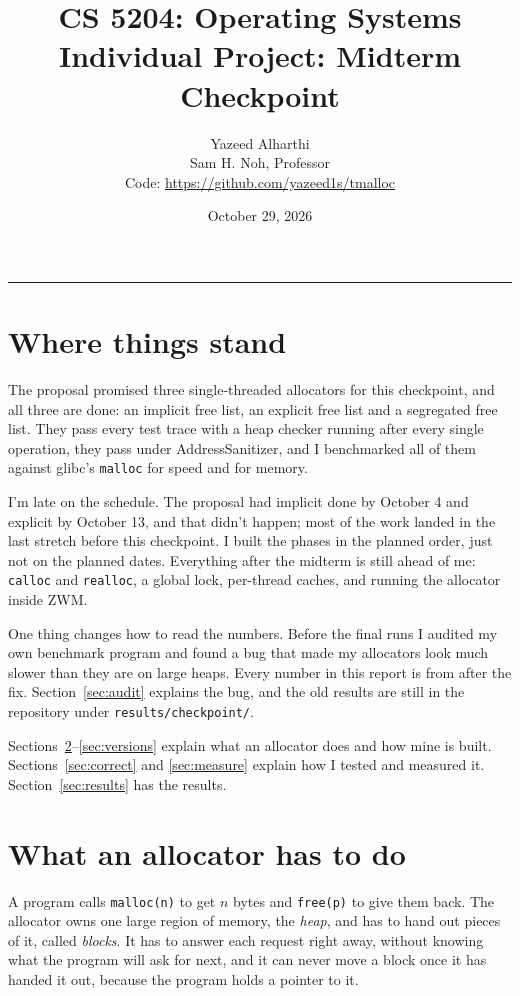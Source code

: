 \documentclass[11pt,letterpaper]{article}
\title{CS 5204: Operating Systems \\ Individual Project: Midterm Checkpoint}
\author{Yazeed Alharthi \\ Sam H. Noh, Professor \\[4pt]
  \small Code: \url{https://github.com/yazeed1s/tmalloc}}
\date{October 29, 2026}
\begin{document}
\maketitle

\begin{center}
  \rule{0.9\textwidth}{0.4pt}
\end{center}

\section{Where things stand}

The proposal promised three single-threaded allocators for this checkpoint, and all three are done: an implicit free list, an explicit free list and a segregated free list. They pass every test trace with a heap checker running after every single operation, they pass under AddressSanitizer, and I benchmarked all of them against glibc's \texttt{malloc} for speed and for memory.

I'm late on the schedule. The proposal had implicit done by October 4 and explicit by October 13, and that didn't happen; most of the work landed in the last stretch before this checkpoint. I built the phases in the planned order, just not on the planned dates. Everything after the midterm is still ahead of me: \texttt{calloc} and \texttt{realloc}, a global lock, per-thread caches, and running the allocator inside ZWM.

One thing changes how to read the numbers. Before the final runs I audited my own benchmark program and found a bug that made my allocators look much slower than they are on large heaps. Every number in this report is from after the fix. Section~\ref{sec:audit} explains the bug, and the old results are still in the repository under \texttt{results/checkpoint/}.

Sections~\ref{sec:background}--\ref{sec:versions} explain what an allocator does and how mine is built. Sections~\ref{sec:correct} and \ref{sec:measure} explain how I tested and measured it. Section~\ref{sec:results} has the results.

\section{What an allocator has to do}
\label{sec:background}

A program calls \texttt{malloc(n)} to get $n$ bytes and \texttt{free(p)} to give them back. The allocator owns one large region of memory, the \emph{heap}, and has to hand out pieces of it, called \emph{blocks}. It has to answer each request right away, without knowing what the program will ask for next, and it can never move a block once it has handed it out, because the program holds a pointer to it.
\end{document}
